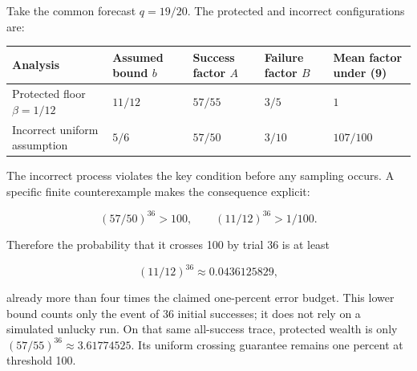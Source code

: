 \documentclass[10pt,a4paper]{article}
\begin{document}
Take the common forecast \(q=19/20\). The protected and incorrect
configurations are:

{\def\LTcaptype{none} %
\begin{longtable}[]{@{}
  >{\raggedright\arraybackslash}p{}
  >{\raggedleft\arraybackslash}p{}
  >{\raggedleft\arraybackslash}p{}
  >{\raggedleft\arraybackslash}p{}
  >{\raggedleft\arraybackslash}p{}@{}}
\toprule\noalign{}
\begin{minipage}[b]{\linewidth}\raggedright
Analysis
\end{minipage} & \begin{minipage}[b]{\linewidth}\raggedleft
Assumed bound \(b\)
\end{minipage} & \begin{minipage}[b]{\linewidth}\raggedleft
Success factor \(A\)
\end{minipage} & \begin{minipage}[b]{\linewidth}\raggedleft
Failure factor \(B\)
\end{minipage} & \begin{minipage}[b]{\linewidth}\raggedleft
Mean factor under (9)
\end{minipage} \\
\midrule\noalign{}
\endhead
\bottomrule\noalign{}
\endlastfoot
Protected floor \(\beta=1/12\) & \(11/12\) & \(57/55\) & \(3/5\) &
\(1\) \\
Incorrect uniform assumption & \(5/6\) & \(57/50\) & \(3/10\) &
\(107/100\) \\
\end{longtable}
}

The incorrect process violates the key condition before any sampling
occurs. A specific finite counterexample makes the consequence explicit:

\[
(57/50)^{36}>100,
\qquad
(11/12)^{36}>1/100. \tag{10}
\]

Therefore the probability that it crosses 100 by trial 36 is at least

\[
(11/12)^{36}\approx0.0436125829,
\]

already more than four times the claimed one-percent error budget. This
lower bound counts only the event of 36 initial successes; it does not
rely on a simulated unlucky run. On that same all-success trace,
protected wealth is only \((57/55)^{36}\approx3.61774525\). Its uniform
crossing guarantee remains one percent at threshold 100.
\end{document}
